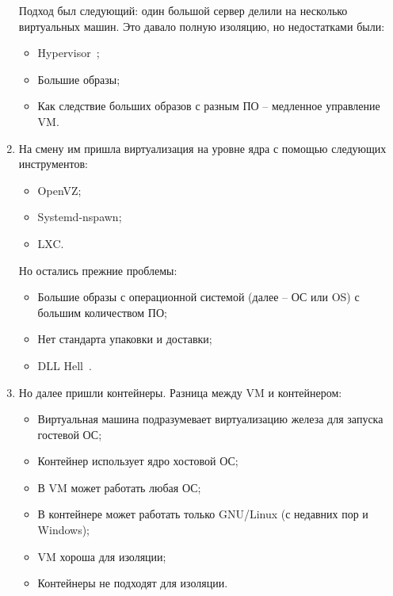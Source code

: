 \begin{enumerate}
        Подход был следующий: один большой сервер делили на несколько виртуальных машин. Это давало полную изоляцию, но недостатками были:
        \begin{itemize}
            \item Hypervisor~\cite{wiki:hypervisor};
            \item Большие образы;
            \item Как следствие больших образов с разным ПО -- медленное управление VM.
        \end{itemize}
    \item На смену им пришла виртуализация на уровне ядра с помощью следующих инструментов:
        \begin{itemize}
            \item OpenVZ;
            \item Systemd-nspawn;
            \item LXC.
        \end{itemize}

        Но остались прежние проблемы:
        \begin{itemize}
            \item Большие образы с операционной системой (далее -- ОС или OS) с большим количеством ПО;
            \item Нет стандарта упаковки и доставки;
            \item DLL Hell~\cite{dick2018dll}.
        \end{itemize}
    \item Но далее пришли контейнеры. Разница между VM и контейнером:
        \begin{itemize}
            \item Виртуальная машина подразумевает виртуализацию железа для запуска гостевой ОС;
            \item Контейнер использует ядро хостовой ОС;
            \item В VM может работать любая ОС;
            \item В контейнере может работать только GNU/Linux (с недавних пор и Windows);
            \item VM хороша для изоляции;
            \item Контейнеры не подходят для изоляции.
        \end{itemize}


\end{enumerate}
